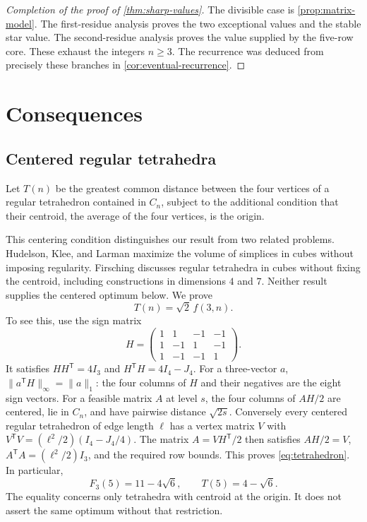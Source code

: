 \documentclass[11pt]{article}
\numberwithin{equation}{section}
\theoremstyle{definition}
\theoremstyle{definition}
\newcommand{\F}{F_3}
\newcommand{\norm}[1]{\lVert#1\rVert}
\begin{document}
\begin{proof}[Completion of the proof of \cref{thm:sharp-values}]
The divisible case is \cref{prop:matrix-model}. The first-residue
analysis proves the two exceptional values and the stable star value.
The second-residue analysis proves the value supplied by the five-row
core. These exhaust the integers $n\ge3$. The recurrence was deduced
from precisely these branches in \cref{cor:eventual-recurrence}.
\end{proof}

\section{Consequences}
\label{sec:consequences}
\subsection{Centered regular tetrahedra}
Let $T(n)$ be the greatest common distance between the four vertices
of a regular tetrahedron contained in $C_n$, subject to the additional
condition that their centroid, the average of the four vertices,
is the origin.

This centering condition distinguishes our result from two related
problems. Hudelson, Klee, and Larman \cite{HudelsonKleeLarman1996}
maximize the volume of simplices in cubes without imposing regularity.
Firsching \cite{Firsching2017} discusses regular tetrahedra in cubes
without fixing the centroid, including constructions in dimensions
$4$ and $7$. Neither result supplies the centered optimum below.
We prove
\begin{equation}\label{eq:tetrahedron}
 T(n)=\sqrt2\,f(3,n).
\end{equation}
To see this, use the sign matrix
\[
 H=\begin{pmatrix}
 1&1&-1&-1\\
 1&-1&1&-1\\
 1&-1&-1&1
 \end{pmatrix}.
\]
It satisfies $HH^{\mathsf T}=4I_3$ and
$H^{\mathsf T}H=4I_4-J_4$. For a three-vector $a$,
$\norm{a^{\mathsf T}H}_\infty=\norm a_1$: the four columns of $H$
and their negatives are the eight sign vectors.
For a feasible matrix $A$ at level $s$, the four columns of $AH/2$
are centered, lie in $C_n$, and have pairwise distance $\sqrt{2s}$.
Conversely every centered regular tetrahedron of edge length $\ell$
has a vertex matrix $V$ with
$V^{\mathsf T}V=(\ell^2/2)(I_4-J_4/4)$. The matrix
$A=VH^{\mathsf T}/2$ then satisfies $AH/2=V$,
$A^{\mathsf T}A=(\ell^2/2)I_3$, and the required row bounds.
This proves \eqref{eq:tetrahedron}. In particular,
\[
 \F(5)=11-4\sqrt6,\qquad T(5)=4-\sqrt6.
\]
The equality concerns only tetrahedra with centroid at the
origin. It does not assert the same optimum without that
restriction.
\end{document}
